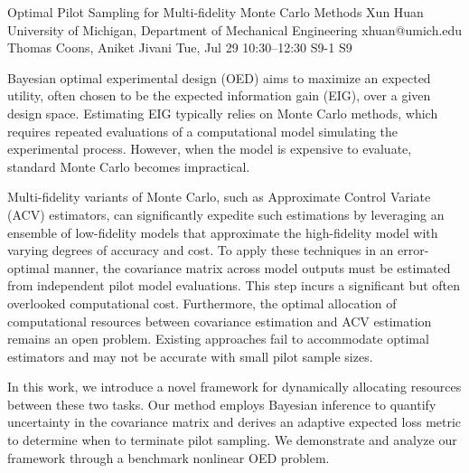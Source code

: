\begin{talk}
  {Optimal Pilot Sampling for Multi-fidelity Monte Carlo Methods}%
  {Xun Huan}%
  {University of Michigan, Department of Mechanical Engineering}%
  {xhuan@umich.edu}%
  {Thomas Coons, Aniket Jivani}%
  {}%
  {Tue, Jul 29 10:30–12:30}%
  {S9-1}%
  {S9}%
  
				

Bayesian optimal experimental design (OED) aims to maximize an expected utility, often chosen to be the expected information gain (EIG), over a given design space. Estimating EIG typically relies on Monte Carlo methods, which requires repeated evaluations of a computational model simulating the experimental process. 
However, when the model is expensive to evaluate, standard Monte Carlo becomes impractical.

Multi-fidelity variants of Monte Carlo, such as Approximate Control Variate (ACV) estimators, can significantly expedite such estimations by leveraging an ensemble of low-fidelity models that approximate the high-fidelity model with varying degrees of accuracy and cost. 
To apply these techniques in an error-optimal manner, the covariance matrix across model outputs must be estimated from independent pilot model evaluations. This step incurs a significant but often overlooked computational cost. 
Furthermore, the optimal allocation of computational resources between 
covariance estimation and 
ACV estimation remains an open problem.  Existing approaches fail to accommodate optimal estimators and may not be accurate with small pilot sample sizes.

In this work, we introduce a novel framework for dynamically allocating resources between these two tasks.
Our method employs Bayesian inference
to quantify uncertainty in the covariance matrix and derives an adaptive expected loss metric
to determine when to terminate pilot sampling. 
We demonstrate and analyze our framework through a benchmark nonlinear OED problem. 


\end{talk}
